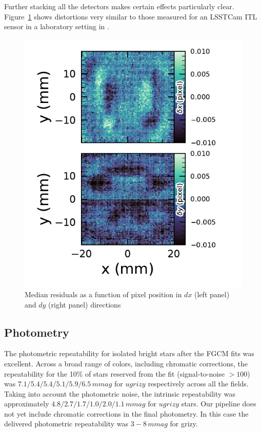 Further stacking all the detectors makes certain effects particularly clear.
Figure~\ref{fig:Astrometry_CCD} shows distortions very similar to those measured for an \gls{LSSTCam} \gls{ITL} sensor in a laboratory setting in \citet{2023PASP..135k5003E}.
\begin{figure}[htb!]
\centering
\includegraphics[width=1.0\linewidth]{Astrometry_CCD.pdf}
\caption{\small Median residuals as a function of pixel position in $dx$ (left panel) and $dy$ (right panel) directions}
\label{fig:Astrometry_CCD}
\end{figure}

\subsection{Photometry}

The photometric repeatability for isolated bright stars after the FGCM fits was excellent.
Across a broad range of colors, including chromatic corrections, the repeatability for the 10\% of stars reserved from the fit (signal-to-noise $> 100$) was $7.1/5.4/5.4/5.1/5.9/6.5\,mmag$ for $ugrizy$ respectively across all the fields.
Taking into account the photometric noise, the intrinsic repeatability was approximately
$4.8/2.7/1.7/1.0/2.0/1.1\,mmag$ for $ugrizy$ stars.
Our pipeline does not yet include chromatic corrections in the final photometry.
In this case the delivered photometric repeatability was $3-8\,mmag$ for grizy.

